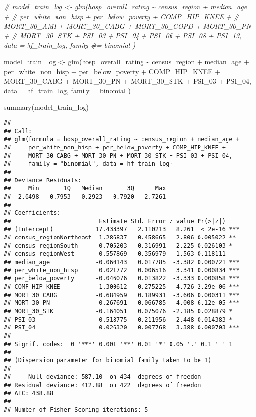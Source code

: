 \documentclass[
]{article}
\newenvironment{Shaded}{\begin{snugshade}}{\end{snugshade}}
\newcommand{\AttributeTok}[1]{\textcolor[rgb]{0.77,0.63,0.00}{#1}}
\newcommand{\CommentTok}[1]{\textcolor[rgb]{0.56,0.35,0.01}{\textit{#1}}}
\newcommand{\FunctionTok}[1]{\textcolor[rgb]{0.00,0.00,0.00}{#1}}
\newcommand{\NormalTok}[1]{#1}
\newcommand{\OtherTok}[1]{\textcolor[rgb]{0.56,0.35,0.01}{#1}}
\newcommand{\SpecialCharTok}[1]{\textcolor[rgb]{0.00,0.00,0.00}{#1}}
\newcommand{\StringTok}[1]{\textcolor[rgb]{0.31,0.60,0.02}{#1}}
\begin{document}
\begin{Shaded}
\begin{Highlighting}[]
\CommentTok{\#  model\_train\_log \textless{}{-} glm(hosp\_overall\_rating \textasciitilde{} census\_region + median\_age + }
\CommentTok{\#    per\_white\_non\_hisp + per\_below\_poverty + COMP\_HIP\_KNEE + }
\CommentTok{\#    MORT\_30\_AMI + MORT\_30\_CABG + MORT\_30\_COPD + MORT\_30\_PN + }
\CommentTok{\#    MORT\_30\_STK + PSI\_03 + PSI\_04 + PSI\_06 + PSI\_08 + PSI\_13, data = hf\_train\_log, family \#= \textquotesingle{}binomial\textquotesingle{} )}

\NormalTok{  model\_train\_log }\OtherTok{\textless{}{-}} \FunctionTok{glm}\NormalTok{(hosp\_overall\_rating }\SpecialCharTok{\textasciitilde{}}\NormalTok{ census\_region }\SpecialCharTok{+}\NormalTok{ median\_age }\SpecialCharTok{+} 
\NormalTok{    per\_white\_non\_hisp }\SpecialCharTok{+}\NormalTok{ per\_below\_poverty }\SpecialCharTok{+}\NormalTok{ COMP\_HIP\_KNEE }\SpecialCharTok{+} 
\NormalTok{    MORT\_30\_CABG }\SpecialCharTok{+}\NormalTok{ MORT\_30\_PN }\SpecialCharTok{+} 
\NormalTok{    MORT\_30\_STK }\SpecialCharTok{+}\NormalTok{ PSI\_03 }\SpecialCharTok{+}\NormalTok{ PSI\_04, }\AttributeTok{data =}\NormalTok{ hf\_train\_log, }\AttributeTok{family =} \StringTok{\textquotesingle{}binomial\textquotesingle{}}\NormalTok{ )}
  
    \FunctionTok{summary}\NormalTok{(model\_train\_log)}
\end{Highlighting}
\end{Shaded}

\begin{verbatim}
## 
## Call:
## glm(formula = hosp_overall_rating ~ census_region + median_age + 
##     per_white_non_hisp + per_below_poverty + COMP_HIP_KNEE + 
##     MORT_30_CABG + MORT_30_PN + MORT_30_STK + PSI_03 + PSI_04, 
##     family = "binomial", data = hf_train_log)
## 
## Deviance Residuals: 
##     Min       1Q   Median       3Q      Max  
## -2.0498  -0.7953  -0.2923   0.7920   2.7261  
## 
## Coefficients:
##                         Estimate Std. Error z value Pr(>|z|)    
## (Intercept)            17.433397   2.110213   8.261  < 2e-16 ***
## census_regionNortheast -1.286837   0.458665  -2.806 0.005022 ** 
## census_regionSouth     -0.705203   0.316991  -2.225 0.026103 *  
## census_regionWest      -0.557869   0.356979  -1.563 0.118111    
## median_age             -0.060143   0.017785  -3.382 0.000721 ***
## per_white_non_hisp      0.021772   0.006516   3.341 0.000834 ***
## per_below_poverty      -0.046076   0.013822  -3.333 0.000858 ***
## COMP_HIP_KNEE          -1.300612   0.275225  -4.726 2.29e-06 ***
## MORT_30_CABG           -0.684959   0.189931  -3.606 0.000311 ***
## MORT_30_PN             -0.267691   0.066785  -4.008 6.12e-05 ***
## MORT_30_STK            -0.164051   0.075076  -2.185 0.028879 *  
## PSI_03                 -0.518775   0.211956  -2.448 0.014383 *  
## PSI_04                 -0.026320   0.007768  -3.388 0.000703 ***
## ---
## Signif. codes:  0 '***' 0.001 '**' 0.01 '*' 0.05 '.' 0.1 ' ' 1
## 
## (Dispersion parameter for binomial family taken to be 1)
## 
##     Null deviance: 587.10  on 434  degrees of freedom
## Residual deviance: 412.88  on 422  degrees of freedom
## AIC: 438.88
## 
## Number of Fisher Scoring iterations: 5
\end{verbatim}
\end{document}
